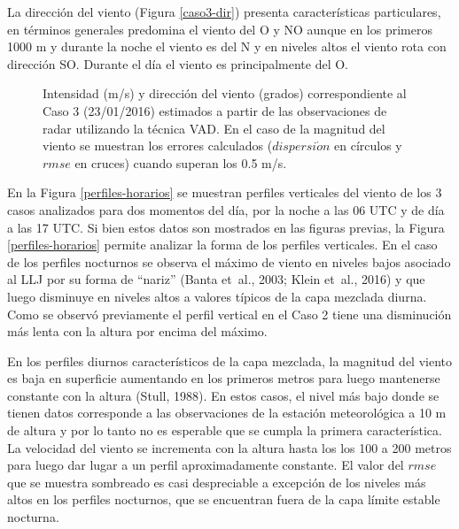 \documentclass[12pt,spanish,oneside, a4paper]{book}
\begin{document}
La dirección del viento (Figura \ref{caso3-dir}) presenta
características particulares, en términos generales predomina el viento
del O y NO aunque en los primeros 1000 m y durante la noche el viento es
del N y en niveles altos el viento rota con dirección SO. Durante el día
el viento es principalmente del O.

\begin{figure}
\newline{}\caption{Intensidad (m/s) y dirección del viento (grados) correspondiente al Caso 3 (23/01/2016) estimados a partir de las observaciones de radar utilizando la técnica VAD. En el caso de la magnitud del viento se muestran los errores calculados ($dispersi\acute{o}n$ en círculos y $rmse$ en cruces) cuando superan los 0.5 m/s. \label{campo-caso3}}\label{fig:campo-caso3}
\end{figure}

En la Figura \ref{perfiles-horarios} se muestran perfiles verticales del
viento de los 3 casos analizados para dos momentos del día, por la noche
a las 06 UTC y de día a las 17 UTC. Si bien estos datos son mostrados en
las figuras previas, la Figura \ref{perfiles-horarios} permite analizar
la forma de los perfiles verticales. En el caso de los perfiles
nocturnos se observa el máximo de viento en niveles bajos asociado al
LLJ por su forma de ``nariz'' (Banta et~al., 2003; Klein et~al., 2016) y
que luego disminuye en niveles altos a valores típicos de la capa
mezclada diurna. Como se observó previamente el perfil vertical en el
Caso 2 tiene una disminución más lenta con la altura por encima del
máximo.

En los perfiles diurnos característicos de la capa mezclada, la magnitud
del viento es baja en superficie aumentando en los primeros metros para
luego mantenerse constante con la altura (Stull, 1988). En estos casos,
el nivel más bajo donde se tienen datos corresponde a las observaciones
de la estación meteorológica a 10 m de altura y por lo tanto no es
esperable que se cumpla la primera característica. La velocidad del
viento se incrementa con la altura hasta los los 100 a 200 metros para
luego dar lugar a un perfil aproximadamente constante. El valor del
\(rmse\) que se muestra sombreado es casi despreciable a excepción de
los niveles más altos en los perfiles nocturnos, que se encuentran fuera
de la capa límite estable nocturna.
\end{document}
